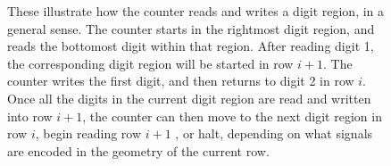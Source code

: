 \begin{figure}[H]
    \caption{\label{fig:counter_read_digit_return_read_digit_general_case3}
    These illustrate how the counter reads and writes a digit region, in a general sense.
    The counter starts in the rightmost digit region, and reads the bottomost digit within
    that region. After reading digit 1, the corresponding digit region will be started in
    row $i + 1$. The counter writes the first digit, and then returns to digit 2 in row $i$.
    Once all the digits in the current digit region are read and written into row $i + 1$,
    the counter can then move to the next digit region in row $i$, begin reading row $i + 1$
    , or halt, depending on what signals are encoded in the geometry of the current row.}

\end{figure}

